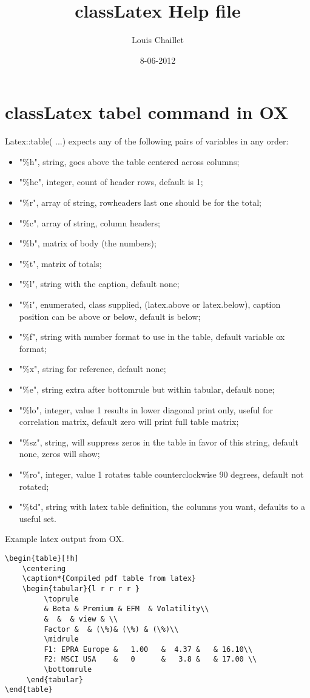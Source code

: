 \documentclass[notitlepage,a4paper]{article}
\begin{document}
	\date{ 8-06-2012}
	\title{classLatex Help file}
	\author{Louis Chaillet}

\section*{classLatex tabel command in OX}
Latex::table( ...)
	expects any of the following pairs of variables in any order:
\begin{itemize}
\item 		"\%h", string, goes above the table centered across columns;
\item		"\%hc", integer, count of header rows, default is 1;
\item		"\%r", array of string, rowheaders last one should be for the total;
\item		"\%c", array of string, column headers;
\item		"\%b", matrix of body (the numbers);
\item		"\%t", matrix of totals;
\item		"\%l", string with the caption, default none;
\item		"\%i", enumerated, class supplied, (latex.above or latex.below), caption position can be above or below, default is below;
\item		"\%f", string with number format to use in the table, default variable ox format;
\item		"\%x", string for reference, default none;
\item		"\%e", string extra after bottomrule but within tabular, default none;
\item		"\%lo", integer, value 1 results in lower diagonal print only, useful for correlation matrix, default zero will print full table matrix;
\item		"\%sz", string, will suppress zeros in the table in favor of this string, default none, zeros will show;
\item		"\%ro", integer, value 1 rotates table counterclockwise 90 degrees, default not rotated;
\item		"\%td", string with latex table definition, the columns you want, defaults to a useful set.
\end{itemize}

Example latex output from OX.
\begin{verbatim}
\begin{table}[!h]
    \centering
    \caption*{Compiled pdf table from latex}
    \begin{tabular}{l r r r r }
         \toprule
         & Beta & Premium & EFM  & Volatility\\
         &  &  & view & \\
         Factor &  & (\%)& (\%) & (\%)\\
         \midrule
         F1: EPRA Europe &   1.00 	&  4.37 &  	& 16.10\\
         F2: MSCI USA 	 &	 0		&	3.8 &	& 17.00 \\
         \bottomrule
     \end{tabular}
\end{table}
\end{verbatim}
\end{document}
